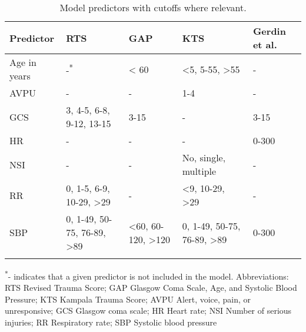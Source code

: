 \begin{table}[!ht]
  \centering
  \caption{Model predictors with cutoffs where relevant.} 
  \label{table:variables_table}
  \begin{adjustbox}{max width = \linewidth}
    \begin{threeparttable} 
    \begin{tabular}{lllll}
      \toprule
      Predictor & RTS & GAP & KTS & Gerdin et al.\\
      \midrule
      Age in years & -\textsuperscript{*}  & < 60 & <5, 5-55, >55 & - \\
      AVPU & - & - & 1-4 & - \\
      GCS & 3, 4-5, 6-8, 9-12, 13-15 & 3-15 & -  & 3-15\\
      HR & -  & -  & -  & 0-300\\
      NSI & -  & - & No, single, multiple & - \\
      RR & 0, 1-5, 6-9, 10-29, >29 & -  & <9, 10-29, >29 & -\\
      SBP & 0, 1-49, 50-75, 76-89, >89 & <60, 60-120, >120 & 0, 1-49, 50-75, 76-89, >89 & 0-300\\
      \bottomrule
      \addlinespace 
    \end{tabular}
    \begin{tablenotes} \footnotesize 
    \item {\textsuperscript{*}- indicates that a given predictor is not included in the
    model. Abbreviations: RTS Revised Trauma Score;
    GAP Glasgow Coma Scale, Age, and Systolic Blood Pressure;
    KTS Kampala Trauma Score; AVPU Alert, voice, pain, or unresponsive; GCS
    Glasgow coma scale; HR Heart rate; NSI Number of serious injuries; RR
    Respiratory rate; SBP Systolic blood pressure}
\end{tablenotes} 
\end{threeparttable} 
\end{adjustbox}
\end{table}